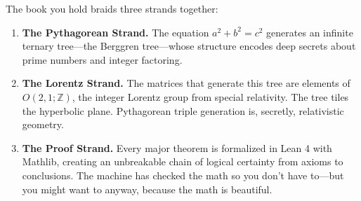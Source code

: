 \documentclass[11pt,twoside,openright]{book}
\theoremstyle{definition}
\newcommand{\Z}{\mathbb{Z}}
\begin{document}
\begin{center}
\end{center}

\medskip

The book you hold braids three strands together:

\begin{enumerate}[leftmargin=2em]
\item \textbf{The Pythagorean Strand.} The equation $a^2+b^2=c^2$ generates
an infinite ternary tree---the Berggren tree---whose structure encodes deep
secrets about prime numbers and integer factoring.

\item \textbf{The Lorentz Strand.} The matrices that generate this tree are
elements of $O(2,1;\Z)$, the integer Lorentz group from special relativity.
The tree tiles the hyperbolic plane. Pythagorean triple generation is,
secretly, relativistic geometry.

\item \textbf{The Proof Strand.} Every major theorem is formalized in Lean 4
with Mathlib, creating an unbreakable chain of logical certainty from axioms
to conclusions. The machine has checked the math so you don't have to---but
you might want to anyway, because the math is beautiful.
\end{enumerate}
\end{document}

